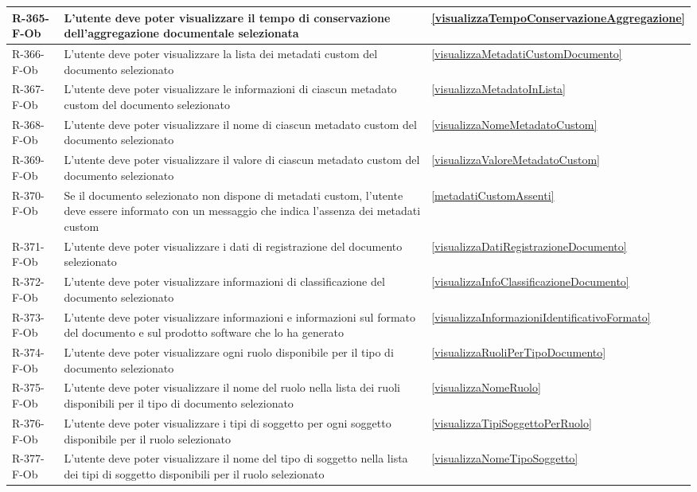 \begin{longtable}{|p{2.5cm}|p{9.5cm}|p{2.5cm}|}
\hline
R-365-F-Ob & L'utente deve poter visualizzare il tempo di conservazione dell'aggregazione documentale selezionata & \ref{visualizzaTempoConservazioneAggregazione} \\
\hline
R-366-F-Ob & L'utente deve poter visualizzare la lista dei metadati custom del documento selezionato & \ref{visualizzaMetadatiCustomDocumento} \\
\hline
R-367-F-Ob & L'utente deve poter visualizzare le informazioni di ciascun metadato custom del documento selezionato & \ref{visualizzaMetadatoInLista} \\
\hline
R-368-F-Ob & L'utente deve poter visualizzare il nome di ciascun metadato custom del documento selezionato & \ref{visualizzaNomeMetadatoCustom} \\
\hline
R-369-F-Ob & L'utente deve poter visualizzare il valore di ciascun metadato custom del documento selezionato & \ref{visualizzaValoreMetadatoCustom} \\
\hline
R-370-F-Ob & Se il documento selezionato non dispone di metadati custom, l'utente deve essere informato con un messaggio che indica l'assenza dei metadati custom & \ref{metadatiCustomAssenti} \\
\hline
R-371-F-Ob & L'utente deve poter visualizzare i dati di registrazione del documento selezionato & \ref{visualizzaDatiRegistrazioneDocumento} \\
\hline
R-372-F-Ob & L'utente deve poter visualizzare informazioni di classificazione del documento selezionato & \ref{visualizzaInfoClassificazioneDocumento} \\
\hline
R-373-F-Ob & L'utente deve poter visualizzare informazioni e informazioni sul formato del documento e sul prodotto software che lo ha generato & \ref{visualizzaInformazioniIdentificativoFormato} \\
\hline
R-374-F-Ob & L'utente deve poter visualizzare ogni ruolo disponibile per il tipo di documento selezionato & \ref{visualizzaRuoliPerTipoDocumento} \\
\hline
R-375-F-Ob & L'utente deve poter visualizzare il nome del ruolo nella lista dei ruoli disponibili per il tipo di documento selezionato & \ref{visualizzaNomeRuolo} \\
\hline
R-376-F-Ob & L'utente deve poter visualizzare i tipi di soggetto per ogni soggetto disponibile per il ruolo selezionato & \ref{visualizzaTipiSoggettoPerRuolo} \\
\hline
R-377-F-Ob & L'utente deve poter visualizzare il nome del tipo di soggetto nella lista dei tipi di soggetto disponibili per il ruolo selezionato & \ref{visualizzaNomeTipoSoggetto} \\

\end{longtable}
